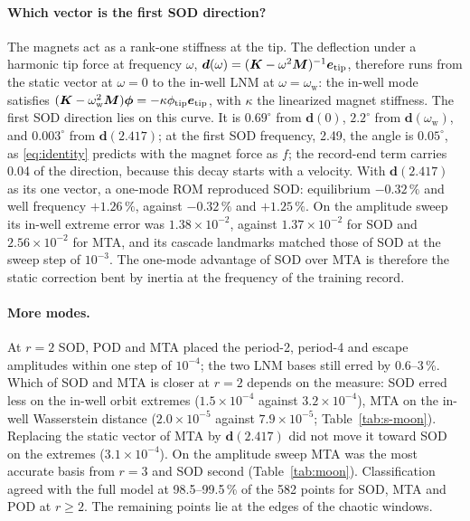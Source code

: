 \documentclass[preprint,12pt]{elsarticle}
\begin{document}
\paragraph{Which vector is the first SOD direction?} The magnets act as a rank-one stiffness at the tip. The deflection under a harmonic tip force at frequency $\omega$, $\bm{d}(\omega)=(\bm{K}-\omega^2\bm{M})^{-1}\bm{e}_{\mathrm{tip}}$, therefore runs from the static vector at $\omega=0$ to the in-well LNM at $\omega=\omega_{\mathrm w}$: the in-well mode satisfies $(\bm{K}-\omega_{\mathrm w}^2\bm{M})\bm{\phi}=-\kappa\phi_{\mathrm{tip}}\bm{e}_{\mathrm{tip}}$, with $\kappa$ the linearized magnet stiffness. The first SOD direction lies on this curve. It is $0.69^\circ$ from $\bm{d}(0)$, $2.2^\circ$ from $\bm{d}(\omega_{\mathrm w})$, and $0.003^\circ$ from $\bm{d}(2.417)$; at the first SOD frequency, 2.49, the angle is $0.05^\circ$, as \eqref{eq:identity} predicts with the magnet force as $f$; the record-end term carries 0.04 of the direction, because this decay starts with a velocity. With $\bm{d}(2.417)$ as its one vector, a one-mode ROM reproduced SOD: equilibrium $-0.32\,\%$ and well frequency $+1.26\,\%$, against $-0.32\,\%$ and $+1.25\,\%$. On the amplitude sweep its in-well extreme error was $1.38\times10^{-2}$, against $1.37\times10^{-2}$ for SOD and $2.56\times10^{-2}$ for MTA, and its cascade landmarks matched those of SOD at the sweep step of $10^{-3}$. The one-mode advantage of SOD over MTA is therefore the static correction bent by inertia at the frequency of the training record.

\paragraph{More modes.} At $r=2$ SOD, POD and MTA placed the period-2, period-4 and escape amplitudes within one step of $10^{-4}$; the two LNM bases still erred by 0.6--3\,\%. Which of SOD and MTA is closer at $r=2$ depends on the measure: SOD erred less on the in-well orbit extremes ($1.5\times10^{-4}$ against $3.2\times10^{-4}$), MTA on the in-well Wasserstein distance ($2.0\times10^{-5}$ against $7.9\times10^{-5}$; Table~\ref{tab:s-moon}). Replacing the static vector of MTA by $\bm{d}(2.417)$ did not move it toward SOD on the extremes ($3.1\times10^{-4}$). On the amplitude sweep MTA was the most accurate basis from $r=3$ and SOD second (Table~\ref{tab:moon}). Classification agreed with the full model at 98.5--99.5\,\% of the 582 points for SOD, MTA and POD at $r\ge2$. The remaining points lie at the edges of the chaotic windows.
\end{document}
